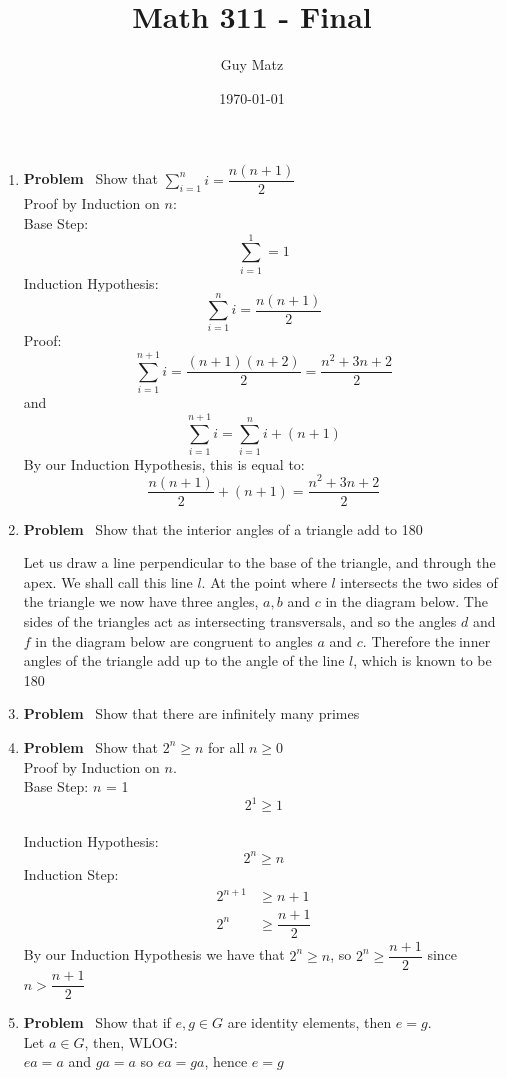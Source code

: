 \documentclass[12pt]{amsart}
\title{\textbf{Math 311 - Final}}
\author{Guy Matz}
\date{\today}
\theoremstyle{definition}
\newcommand{\itep}{\item {\bfseries Problem}\ }
\begin{document}
 

\maketitle

\begin{enumerate}[series=p]
\itep 
\label{drp}
Show that $\sum_{i=1}^{n} i = \dfrac{n(n+1)}{2}$
\\
Proof by Induction on $n$:
\\
Base Step: 
$$\sum_{i=1}^{1} = 1$$
Induction Hypothesis:
$$\sum_{i=1}^{n} i = \dfrac{n(n+1)}{2}$$
Proof:
$$\sum_{i=1}^{n+1} i = \dfrac{(n+1)(n+2)}{2} = \dfrac{n^2 + 3n + 2}{2}$$
and $$\sum_{i=1}^{n+1} i = \sum_{i=1}^{n} i + (n+1)$$
By our Induction Hypothesis, this is equal to:
\\
$$\dfrac{n(n+1)}{2} + (n+1) = \dfrac{n^2 + 3n + 2}{2}$$
\newpage

\itep
Show that the interior angles of a triangle add to 180

Let us draw a line perpendicular to the base of the triangle, and through the apex.  We shall call this line $l$.  At the point where $l$ intersects the two sides of the triangle we now have three angles, $a, b$ and $c$ in the diagram below.  The sides of the triangles act as intersecting transversals, and so the angles $d$ and $f$ in the diagram below are congruent to angles $a$ and $c$. Therefore the inner angles of the triangle add up to the angle of the line $l$, which is known to be 180
\\
\newpage

\itep
Show that there are infinitely many primes
\\

\newpage

\itep
Show that $2^n \geq n$ for all $n \geq 0$
\\
Proof by Induction on $n$.\\
Base Step: $n$ = 1
$$2^1 \geq 1$$
\\
Induction Hypothesis:\\
$$2^n \geq n$$
Induction Step:\\
\begin{align*}
2^{n+1} &\geq  n+1\\
2^n &\geq \dfrac{n + 1}{2}
\end{align*}
By our Induction Hypothesis we have that $2^n \geq n$,
so $2^n \geq \dfrac{n+1}{2}$ since $n > \dfrac{n+1}{2}$
\newpage

\itep
Show that if $e, g \in G$ are identity elements, then $e = g$.
\\
Let $a \in G$, then, WLOG:\\
$ea = a$ and $ga = a$ so $ea = ga$, hence $e = g$
\end{enumerate}
\end{document}
